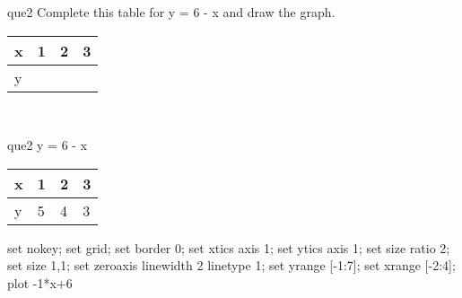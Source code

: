 \documentclass[13.5pt, varwidth=true]{beamer}
\begin{document}
\begin{frame}[shrink=19,fragile]
	\begin{beamercolorbox}[rounded=true, left, shadow=true,wd=14.8cm]{que2}
		 Complete this table for y = 6 - x and draw the graph. \\[0.3cm] \renewcommand{\arraystretch}{1.2}\begin{tabular}{|C|C|C|C|} \hline x & 1 & 2 & 3 \\ \hline y & & & \\ \hline \end{tabular}\\[0.3cm]
	\end{beamercolorbox}
\end{frame}
\begin{frame}[shrink=19,fragile]
	\begin{beamercolorbox}[rounded=true, left, shadow=true,wd=14.8cm]{que2}
		y = 6 - x\renewcommand{\arraystretch}{1.2}\begin{tabular}{|C|C|C|C|} \hline x & 1 & 2 & 3 \\ \hline y & 5 & 4 & 3\\ \hline \end{tabular}\begin{gnuplot}[terminal=pdf] set nokey; set grid; set border 0; set xtics axis 1; set ytics axis 1; set size ratio 2; set size 1,1; set zeroaxis linewidth 2 linetype 1; set yrange [-1:7]; set xrange [-2:4]; plot -1*x+6 \end{gnuplot}
	\end{beamercolorbox}
\end{frame}
\end{document}
